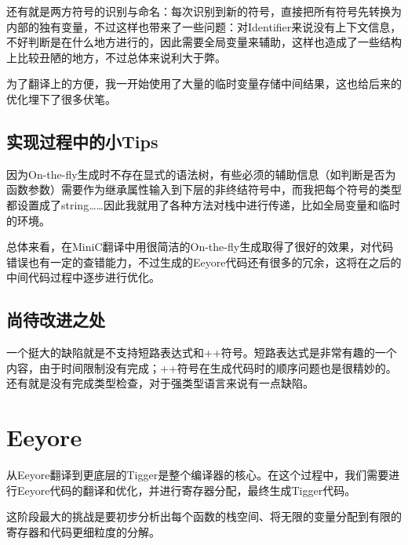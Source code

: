 \documentclass{ctexart}
\begin{document}
还有就是两方符号的识别与命名：每次识别到新的符号，直接把所有符号先转换为内部的独有变量，不过这样也带来了一些问题：对Identifier来说没有上下文信息，不好判断是在什么地方进行的，因此需要全局变量来辅助，这样也造成了一些结构上比较丑陋的地方，不过总体来说利大于弊。

为了翻译上的方便，我一开始使用了大量的临时变量存储中间结果，这也给后来的优化埋下了很多伏笔。

\subsection{实现过程中的小Tips}

因为On-the-fly生成时不存在显式的语法树，有些必须的辅助信息（如判断是否为函数参数）需要作为继承属性输入到下层的非终结符号中，而我把每个符号的类型都设置成了string……因此我就用了各种方法对栈中进行传递，比如全局变量和临时的环境。

总体来看，在MiniC翻译中用很简洁的On-the-fly生成取得了很好的效果，对代码错误也有一定的查错能力，不过生成的Eeyore代码还有很多的冗余，这将在之后的中间代码过程中逐步进行优化。

\subsection{尚待改进之处}

一个挺大的缺陷就是不支持短路表达式和++符号。短路表达式是非常有趣的一个内容，由于时间限制没有完成；++符号在生成代码时的顺序问题也是很精妙的。还有就是没有完成类型检查，对于强类型语言来说有一点缺陷。

\section{Eeyore}

从Eeyore翻译到更底层的Tigger是整个编译器的核心。在这个过程中，我们需要进行Eeyore代码的翻译和优化，并进行寄存器分配，最终生成Tigger代码。

这阶段最大的挑战是要初步分析出每个函数的栈空间、将无限的变量分配到有限的寄存器和代码更细粒度的分解。
\newpage
\end{document}
